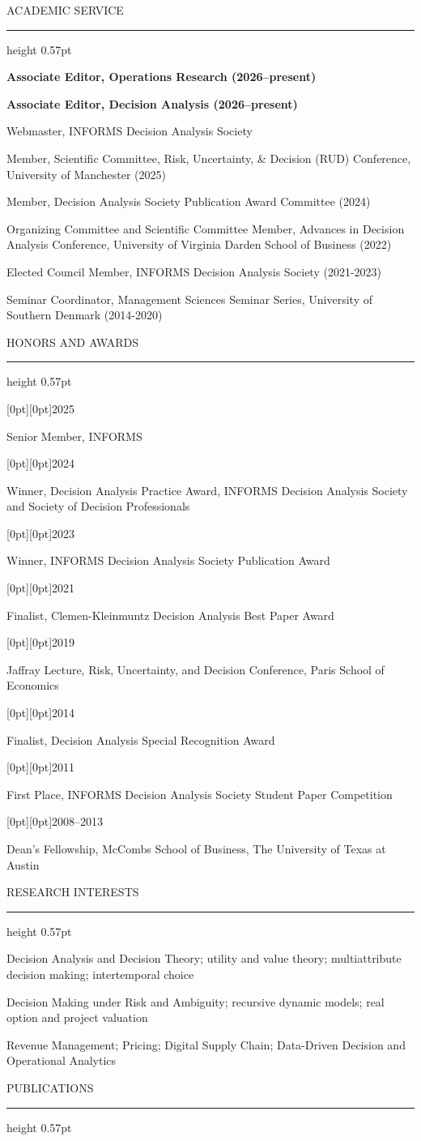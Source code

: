 \documentclass[10pt,a4paper]{article}
\newcommand{\cvsection}[1]{%
  \par\addvspace{8.1pt}\needspace{3\baselineskip}%
  {\headingfont\fontsize{10.35}{12}\selectfont\color{navy}\MakeUppercase{#1}}\par\vspace{3.4pt}%
  {\color{ruleblue}\hrule height 0.57pt}\vspace{5pt}%
}
\newcommand{\cvdated}[3][1.41in]{%
  \par\noindent\begin{minipage}[t]{#1}\raggedright\raisebox{0.8pt}[0pt][0pt]{\metafont\fontsize{8.55}{11.6}\selectfont\color{slate}#2}\end{minipage}%
  \hspace{0.11in}%
  \begin{minipage}[t]{\dimexpr\linewidth-#1-0.11in\relax}\raggedright #3\end{minipage}%
  \par\vspace{2.4pt}%
}
\newcommand{\cvitem}[1]{%
 \par\noindent\hangindent=12.5pt\hangafter=1%
 {\makebox[12.5pt][l]{\color{accent}\fontsize{6}{8}\selectfont\raisebox{1.2pt}{\textbullet}}}#1\par\vspace{1.7pt}%
}
\begin{document}
\cvsection{Academic Service}
\cvitem{\textbf{Associate Editor, Operations Research (2026--present)}}
\cvitem{\textbf{Associate Editor, Decision Analysis (2026--present)}}
\cvitem{Webmaster, INFORMS Decision Analysis Society}
\cvitem{Member, Scientific Committee, Risk, Uncertainty, \& Decision (RUD) Conference, University of Manchester (2025)}
\cvitem{Member, Decision Analysis Society Publication Award Committee (2024)}
\cvitem{Organizing Committee and Scientific Committee Member, Advances in Decision Analysis Conference, University of Virginia Darden School of Business (2022)}
\cvitem{Elected Council Member, INFORMS Decision Analysis Society (2021-2023)}
\cvitem{Seminar Coordinator, Management Sciences Seminar Series, University of Southern Denmark (2014-2020)}
\cvsection{Honors and Awards}
\cvdated{2025}{Senior Member, INFORMS}
\cvdated{2024}{Winner, Decision Analysis Practice Award, INFORMS Decision Analysis Society and Society of Decision Professionals}
\cvdated{2023}{Winner, INFORMS Decision Analysis Society Publication Award}
\cvdated{2021}{Finalist, Clemen-Kleinmuntz Decision Analysis Best Paper Award}
\cvdated{2019}{Jaffray Lecture, Risk, Uncertainty, and Decision Conference, Paris School of Economics}
\cvdated{2014}{Finalist, Decision Analysis Special Recognition Award}
\cvdated{2011}{First Place, INFORMS Decision Analysis Society Student Paper Competition}
\cvdated{2008–2013}{Dean's Fellowship, McCombs School of Business, The University of Texas at Austin}
\cvsection{Research Interests}
\cvitem{Decision Analysis and Decision Theory; utility and value theory; multiattribute decision making; intertemporal choice}
\cvitem{Decision Making under Risk and Ambiguity; recursive dynamic models; real option and project valuation}
\cvitem{Revenue Management; Pricing; Digital Supply Chain; Data-Driven Decision and Operational Analytics}
\cvsection{Publications}
\end{document}
